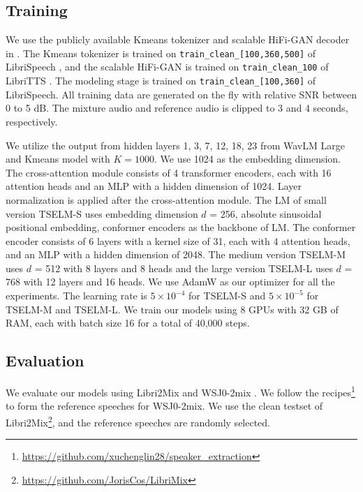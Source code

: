 \documentclass[conference]{IEEEtran}
\begin{document}
\subsection{Training}

We use the publicly available Kmeans tokenizer and scalable 
HiFi-GAN decoder in \cite{speechbrain}. The Kmeans tokenizer
is trained on \texttt{train\_clean\_[100,360,500]} of
LibriSpeech \cite{librispeech}, and the scalable HiFi-GAN is trained on \texttt{train\_clean\_100} of 
LibriTTS \cite{libritts}. The modeling stage is trained on 
\texttt{train\_clean\_[100,360]} of LibriSpeech. All training data are 
generated on the fly with relative SNR between 0 to 5 dB. The mixture audio and reference audio is clipped to 3 and 4 seconds, respectively.

We utilize the output from hidden layers 1, 3, 7, 12, 18, 23 from WavLM Large and Kmeans model with 
\(K=1000\).
We use 1024 as the embedding dimension.  The cross-attention module consists of 4 transformer encoders, each with 16 attention heads and an MLP with a hidden dimension of 1024. Layer normalization is applied after the cross-attention module.
The LM of small version TSELM-S uses 
embedding dimension \(d\) = 256, absolute sinusoidal positional embedding, conformer encoders as the backbone of LM. The conformer encoder consists of 6 layers with a kernel size of 31, each with 4 attention heads, and an MLP with a hidden dimension of 2048. The medium version TSELM-M uses \(d\) = 512 with 8 layers and 8 heads and the large version TSELM-L uses 
\(d\) = 768 with 12 layers and 16 heads. We use AdamW as 
our optimizer for all the experiments. The learning rate 
is \(5 \times 10^{-4}\) for TSELM-S and \(5 \times 10^{-5}\) for TSELM-M and TSELM-L. We train our models using 8 GPUs with 32 GB of RAM, each with batch size 16 for a total of 40,000 steps.


\subsection{Evaluation}


We evaluate our models using Libri2Mix\cite{librimix} and WSJ0-2mix \cite{wsj0}.
We follow the recipes\footnote{\href{https://github.com/xuchenglin28/speaker_extraction}{https://github.com/xuchenglin28/speaker\_extraction}} to form the reference speeches for 
WSJ0-2mix.
We use the clean testset of Libri2Mix\footnote{\href{https://github.com/JorisCos/LibriMix}{https://github.com/JorisCos/LibriMix}}, and the reference speeches are randomly selected.
\end{document}

